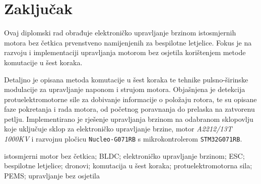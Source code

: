\documentclass[diplomskirad]{fer}
\begin{document}
\chapter{Zaključak}
\label{pog:zakljucak}





\begin{sazetak}

	Ovaj diplomski rad obrađuje elektroničko upravljanje brzinom istosmjernih
	motora bez četkica prvenstveno namijenjenih za bespilotne letjelice. Fokus je
	na razvoju i implementaciji upravljanja motorom bez osjetila korištenjem metode
	komutacije u šest koraka.

	Detaljno je opisana metoda komutacije u šest koraka te tehnike pulsno-širinske
	modulacije za upravljanje naponom i strujom motora. Objašnjena je detekcija
	protuelektromotorne sile za dobivanje informacije o položaju rotora, te su
	opisane faze pokretanja i rada motora, od početnog poravnanja do prelaska na
	zatvorenu petlju. Implementirano je rješenje upravljanja brzinom na odabranom
	sklopovlju koje uključuje sklop za elektroničko upravljanje brzine, motor
	\textit{A2212/13T 1000KV} i razvojnu pločicu \texttt{Nucleo-G071RB} s
	mikrokontrolerom \texttt{STM32G071RB}.
\end{sazetak}

\begin{kljucnerijeci}
	istosmjerni motor bez četkica; BLDC; elektroničko upravljanje brzinom; ESC; bespilotne letjelice; dronovi; komutacija u šest koraka; protuelektromotorna sila; PEMS; upravljanje bez osjetila
\end{kljucnerijeci}
\end{document}
